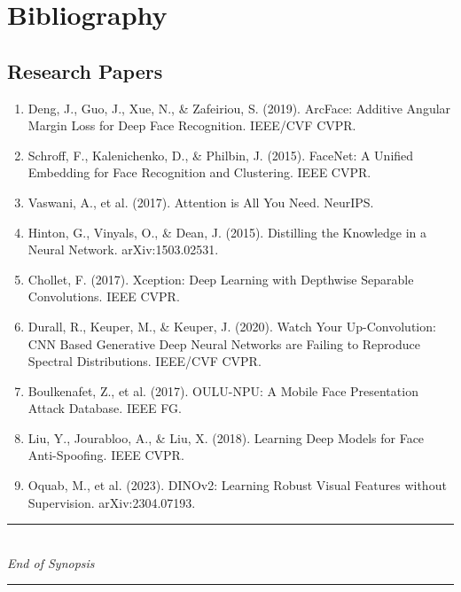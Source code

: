 \documentclass[12pt,a4paper]{article}
\begin{document}
\section{Bibliography}

\subsection{Research Papers}

\begin{enumerate}
    \item Deng, J., Guo, J., Xue, N., \& Zafeiriou, S. (2019). ArcFace: Additive Angular Margin Loss for Deep Face Recognition. IEEE/CVF CVPR.
    \item Schroff, F., Kalenichenko, D., \& Philbin, J. (2015). FaceNet: A Unified Embedding for Face Recognition and Clustering. IEEE CVPR.
    \item Vaswani, A., et al. (2017). Attention is All You Need. NeurIPS.
    \item Hinton, G., Vinyals, O., \& Dean, J. (2015). Distilling the Knowledge in a Neural Network. arXiv:1503.02531.
    \item Chollet, F. (2017). Xception: Deep Learning with Depthwise Separable Convolutions. IEEE CVPR.
    \item Durall, R., Keuper, M., \& Keuper, J. (2020). Watch Your Up-Convolution: CNN Based Generative Deep Neural Networks are Failing to Reproduce Spectral Distributions. IEEE/CVF CVPR.
    \item Boulkenafet, Z., et al. (2017). OULU-NPU: A Mobile Face Presentation Attack Database. IEEE FG.
    \item Liu, Y., Jourabloo, A., \& Liu, X. (2018). Learning Deep Models for Face Anti-Spoofing. IEEE CVPR.
    \item Oquab, M., et al. (2023). DINOv2: Learning Robust Visual Features without Supervision. arXiv:2304.07193.
\end{enumerate}

\begin{center}
\rule{\textwidth}{0.5pt}\\[0.2cm]
\textit{End of Synopsis}\\[0.2cm]
\rule{\textwidth}{0.5pt}
\end{center}
\end{document}
